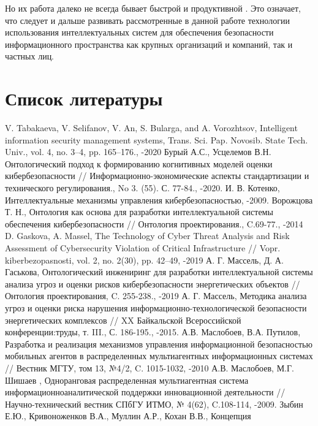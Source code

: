 Но их работа далеко не всегда бывает быстрой и продуктивной \cite{mob, upg}. Это означает,
что следует и дальше развивать рассмотренные в данной работе технологии использования интеллектуальных
систем для обеспечения безопасности информационного пространства как крупных организаций и компаний, так
и частных лиц.
\newpage

\section{Список литературы}
\medskip

\begin{thebibliography}{}
V. Tabakaeva, V. Selifanov, V. An, S. Bularga, and A. Vorozhtsov,
Intelligent information security management systems,  Trans. Sci. Pap. Novosib. State Tech. Univ., vol. 4,
no. 3–4, pp. 165–176., -2020
Бурый А.С., Усцелемов В.Н. Онтологический подход к формированию когнитивных моделей оценки
кибербезопасности // Информационно-экономические аспекты стандартизации и технического
регулирования.,  No 3. (55). С. 77-84., -2020.
И. В. Котенко, Интеллектуальные механизмы управления кибербезопасностью, -2009.
Ворожцова Т. Н., Онтология как основа для разработки интеллектуальной системы обеспечения
кибербезопасности // Онтология проектирования., C.69-77., -2014
D. Gaskova, A. Massel, The Technology of Cyber Threat Analysis and Risk Assessment of Cybersecurity
Violation of Critical Infrastructure // Vopr. kiberbezopasnosti, vol. 2, no. 2(30), pp. 42–49, -2019
А. Г. Массель, Д. А. Гаськова, Онтологический инжениринг для разработки интеллектуальной системы анализа угроз
и оценки рисков кибербезопасности энергетических объектов // Онтология проектирования, C. 255-238., -2019
А. Г. Массель, Методика анализа угроз и оценки риска нарушения информационно-технологической
безопасности энергетических комплексов // XX Байкальской Всероссийской конференции:труды,
т. III., С. 186-195., -2015.
А.В. Маслобоев, В.А. Путилов, Разработка и реализация механизмов управления информационной безопасностью
мобильных агентов в распределенных мультиагентных информационных системах // Вестник МГТУ, том 13, №4/2,
C. 1015-1032, -2010
А.В. Маслобоев, М.Г. Шишаев ,  Одноранговая распределенная мультиагентная система
информационноаналитической поддержки инновационной деятельности //
Научно-технический вестник СПбГУ ИТМО, № 4(62), C.108-114, -2009.
Зыбин Е.Ю., Кривоноженков В.А., Муллин А.Р., Кохан В.В., Концепция

\end{thebibliography}
